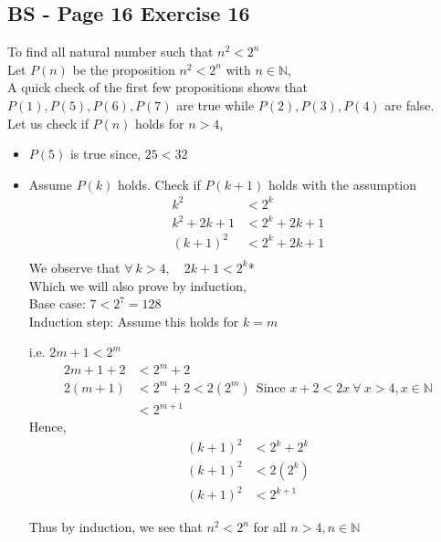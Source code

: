 \documentclass{article}
\begin{document}
\subsection*{BS - Page 16 Exercise 16}
To find all natural number such that \(n^2 < 2^n\)
\\

Let \(P(n)\) be the proposition \(n^2 < 2^n\) with \(n \in \mathbb{N}\), \\
A quick check of the first few propositions shows that \(P(1), P(5), P(6), P(7)\) are
true while \(P(2), P(3), P(4)\) are false. \\

Let us check if \(P(n)\) holds for \(n > 4\),

\begin{itemize}
    \item \(P(5)\) is true since, \(25 < 32\)
    \item Assume \(P(k)\) holds.
Check if \(P(k+1)\) holds with the assumption
\begin{align*}
    k^2 &< 2^{k} \\
    k^2 + 2k + 1 &< 2^k + 2k + 1 \\
    (k+1)^2 &< 2^k + 2k + 1 \\
\end{align*}
We observe that \(\forall \ k > 4, \quad 2k + 1 < 2^k\)* \\
Which we will also prove by induction, \\

Base case: \(7 < 2^7 = 128\) \\
Induction step: Assume this holds for \(k = m\)

i.e. \(2m+1<2^m\) \\
\begin{align*}
    2m+1 + 2 &< 2^m +2 \\
    2(m+1) &< 2^m + 2 < 2(2^m) \ \ \text{Since } x+2 < 2x \ \forall \ x> 4, x \in \mathbb{N} \\
    &< 2^{m+1}
\end{align*}
Hence,
\begin{align*}
    (k+1)^2 &< 2^k + 2^k \\
    (k+1)^2 &< 2(2^k) \\
    (k+1)^2 &< 2^{k+1}
\end{align*}

Thus by induction, we see that \(n^2 < 2^n\) for all \(n > 4, n \in \mathbb{N}\)
\end{itemize}
\end{document}
